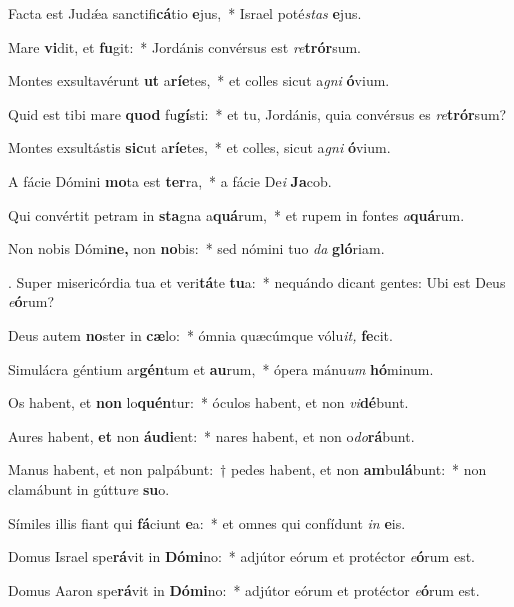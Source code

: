 \item Facta est Judǽa sanctifi\textbf{cá}tio \textbf{e}jus,~* Israel poté\textit{stas} \textbf{e}jus.
\item Mare \textbf{vi}dit, et \textbf{fu}git:~* Jordánis convérsus est \textit{re}\textbf{trór}sum.
\item Montes exsultavérunt \textbf{ut} a\textbf{rí}\textbf{e}tes,~* et colles sicut a\textit{gni} \textbf{ó}vium.
\item Quid est tibi mare \textbf{quod} fu\textbf{gí}sti:~* et tu, Jordánis, quia convérsus es \textit{re}\textbf{trór}sum?
\item Montes exsultástis \textbf{sic}ut a\textbf{rí}\textbf{e}tes,~* et colles, sicut a\textit{gni} \textbf{ó}vium.
\item A fácie Dómini \textbf{mo}ta est \textbf{ter}ra,~* a fácie De\textit{i} \textbf{Ja}cob.
\item Qui convértit petram in \textbf{sta}gna a\textbf{quá}rum,~* et rupem in fontes \textit{a}\textbf{quá}rum.
\item Non nobis Dómi\textbf{ne,} non \textbf{no}bis:~* sed nómini tuo \textit{da} \textbf{gló}riam.
\item. Super misericórdia tua et veri\textbf{tá}te \textbf{tu}a:~* nequándo dicant gentes: Ubi est Deus \textit{e}\textbf{ó}rum?
\item Deus autem \textbf{no}ster in \textbf{cæ}lo:~* ómnia quæcúmque vólu\textit{it,} \textbf{fe}cit.
\item Simulácra géntium ar\textbf{gén}tum et \textbf{au}rum,~* ópera mánu\hspace{0.03em}\textit{um} \textbf{hó}minum.
\item Os habent, et \textbf{non} lo\textbf{quén}tur:~* óculos habent, et non \textit{vi}\textbf{dé}bunt.
\item Aures habent, \textbf{et} non \textbf{áu}\textbf{di}ent:~* nares habent, et non o\textit{do}\textbf{rá}bunt.
\item Manus habent, et non palpábunt:~† pedes habent, et non \textbf{am}bu\textbf{lá}bunt:~* non clamábunt in gúttu\textit{re} \textbf{su}o.
\item Símiles illis fiant qui \textbf{fá}ciunt \textbf{e}a:~* et omnes qui confídunt \textit{in} \textbf{e}is.
\item Domus Israel spe\textbf{rá}vit in \textbf{Dó}\textbf{mi}no:~* adjútor eórum et protéctor \textit{e}\textbf{ó}rum est.
\item Domus Aaron spe\textbf{rá}vit in \textbf{Dó}\textbf{mi}no:~* adjútor eórum et protéctor \textit{e}\textbf{ó}rum est.
